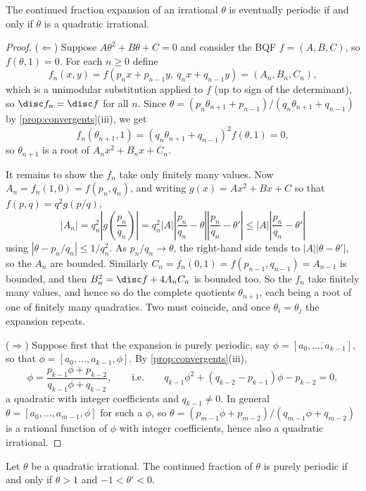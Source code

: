 \begin{theorem}[Lagrange]\label{thm:lagrangecf}
	The continued fraction expansion of an irrational $\theta$ is eventually periodic if and only if $\theta$ is a quadratic irrational.
\end{theorem}
\begin{proof}
	($\Leftarrow$) Suppose $A\theta^2 + B\theta + C = 0$ and consider the BQF $f = (A, B, C)$, so $f(\theta, 1) = 0$. For each $n \geq 0$ define
	$$
	f_n(x,y) = f(p_nx + p_{n-1}y, \ q_nx+q_{n-1}y) = (A_n, B_n, C_n),
	$$
	which is a unimodular substitution applied to $f$ (up to sign of the determinant), so $\disc f_n = \disc f$ for all $n$. Since $\theta = (p_n\theta_{n+1}+p_{n-1})/(q_n\theta_{n+1}+q_{n-1})$ by \autoref{prop:convergents}(iii), we get
	$$
	f_n(\theta_{n+1}, 1) = (q_n\theta_{n+1}+q_{n-1})^2 f(\theta, 1) = 0,
	$$
	so $\theta_{n+1}$ is a root of $A_nx^2 + B_nx + C_n$.

	It remains to show the $f_n$ take only finitely many values. Now $A_n = f_n(1,0) = f(p_n, q_n)$, and writing $g(x) = Ax^2+Bx+C$ so that $f(p,q) = q^2g(p/q)$,
	$$
	|A_n| = q_n^2\left|g\!\left(\frac{p_n}{q_n}\right)\right| = q_n^2|A|\left|\frac{p_n}{q_n} - \theta\right|\left|\frac{p_n}{q_n}-\theta'\right| \leq |A|\left|\frac{p_n}{q_n} - \theta'\right|
	$$
	using $|\theta - p_n/q_n| \leq 1/q_n^2$. As $p_n/q_n \to \theta$, the right-hand side tends to $|A||\theta - \theta'|$, so the $A_n$ are bounded. Similarly $C_n = f_n(0,1) = f(p_{n-1}, q_{n-1}) = A_{n-1}$ is bounded, and then $B_n^2 = \disc f + 4A_nC_n$ is bounded too. So the $f_n$ take finitely many values, and hence so do the complete quotients $\theta_{n+1}$, each being a root of one of finitely many quadratics. Two must coincide, and once $\theta_i = \theta_j$ the expansion repeats.

	($\Rightarrow$) Suppose first that the expansion is purely periodic, say $\phi = [\overline{a_0, \dots, a_{k-1}}]$, so that $\phi = [a_0, \dots, a_{k-1}, \phi]$. By \autoref{prop:convergents}(iii),
	$$
	\phi = \frac{p_{k-1}\phi + p_{k-2}}{q_{k-1}\phi+q_{k-2}}, \qquad \text{i.e.} \qquad q_{k-1}\phi^2 + (q_{k-2} - p_{k-1})\phi - p_{k-2} = 0,
	$$
	a quadratic with integer coefficients and $q_{k-1} \neq 0$. In general $\theta = [a_0, \dots, a_{m-1}, \phi]$ for such a $\phi$, so $\theta = (p_{m-1}\phi + p_{m-2})/(q_{m-1}\phi+q_{m-2})$ is a rational function of $\phi$ with integer coefficients, hence also a quadratic irrational.
\end{proof}

\begin{theorem}[Galois]\label{nt-thm:galois}
	Let $\theta$ be a quadratic irrational. The continued fraction of $\theta$ is purely periodic if and only if $\theta > 1$ and $-1 < \theta' < 0$.
\end{theorem}

